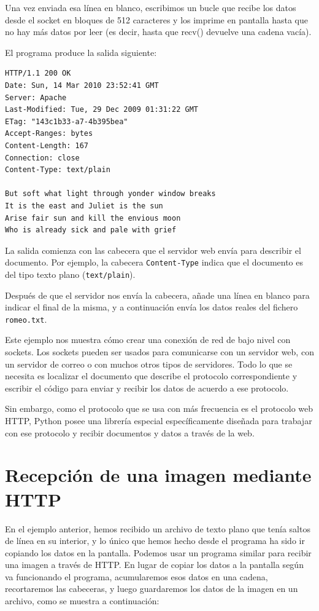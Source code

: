 Una vez enviada esa línea en blanco, escribimos un bucle que recibe los datos
desde el socket en bloques de 512 caracteres y los imprime en pantalla
hasta que no hay más datos por leer (es decir, hasta que recv() devuelve
una cadena vacía).

El programa produce la salida siguiente:

\beforeverb
\begin{verbatim}
HTTP/1.1 200 OK
Date: Sun, 14 Mar 2010 23:52:41 GMT
Server: Apache
Last-Modified: Tue, 29 Dec 2009 01:31:22 GMT
ETag: "143c1b33-a7-4b395bea"
Accept-Ranges: bytes
Content-Length: 167
Connection: close
Content-Type: text/plain

But soft what light through yonder window breaks
It is the east and Juliet is the sun
Arise fair sun and kill the envious moon
Who is already sick and pale with grief
\end{verbatim}
\afterverb
%
La salida comienza con las cabecera que el servidor web envía
para describir el documento.
Por ejemplo, la cabecera {\tt Content-Type} indica que
el documento es del tipo texto plano ({\tt text/plain}).

Después de que el servidor nos envía la cabecera, añade una línea en blanco
para indicar el final de la misma, y a continuación envía los datos
reales del fichero {\tt romeo.txt}.

Este ejemplo nos muestra cómo crear una conexión de red de bajo nivel
con sockets. Los sockets pueden ser usados para comunicarse con un servidor
web, con un servidor de correo o con muchos otros tipos de servidores.
Todo lo que se necesita es localizar el documento que describe
el protocolo correspondiente y escribir el código para enviar y recibir los datos
de acuerdo a ese protocolo.

Sin embargo, como el protocolo que se usa con más frecuencia es
el protocolo web HTTP, Python posee una librería
especial específicamente diseñada para trabajar con ese protocolo
y recibir documentos y datos a través de la web.

\section{Recepción de una imagen mediante HTTP}

En el ejemplo anterior, hemos recibido un archivo de texto plano
que tenía saltos de línea en su interior, y lo único que hemos hecho
desde el programa ha sido ir copiando los datos en la pantalla. Podemos usar un programa
similar para recibir una imagen a través de HTTP. En lugar
de copiar los datos a la pantalla según va funcionando el programa,
acumularemos esos datos en una cadena, recortaremos las cabeceras,
y luego guardaremos los datos de la imagen en un archivo, como se muestra a continuación:

